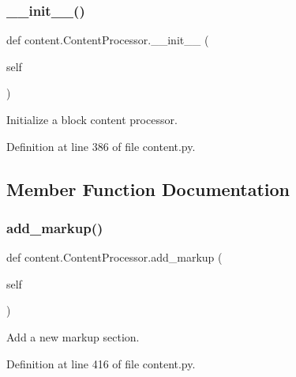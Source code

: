 \subsubsection{\texorpdfstring{\+\_\+\+\_\+init\+\_\+\+\_\+()}{\_\_init\_\_()}}
{\footnotesize\ttfamily def content.\+Content\+Processor.\+\_\+\+\_\+init\+\_\+\+\_\+ (\begin{DoxyParamCaption}\item[{}]{self }\end{DoxyParamCaption})}

\begin{DoxyVerb}Initialize a block content processor.\end{DoxyVerb}
 

Definition at line 386 of file content.\+py.



\subsection{Member Function Documentation}
\mbox{\label{classcontent_1_1_content_processor_a80c9aef136880bba3d0575785bcc1794}} 
\subsubsection{\texorpdfstring{add\+\_\+markup()}{add\_markup()}}
{\footnotesize\ttfamily def content.\+Content\+Processor.\+add\+\_\+markup (\begin{DoxyParamCaption}\item[{}]{self }\end{DoxyParamCaption})}

\begin{DoxyVerb}Add a new markup section.\end{DoxyVerb}
 

Definition at line 416 of file content.\+py.

\mbox{\label{classcontent_1_1_content_processor_ad0b20f704dbd7460afd09fa05b898b1a}} 
